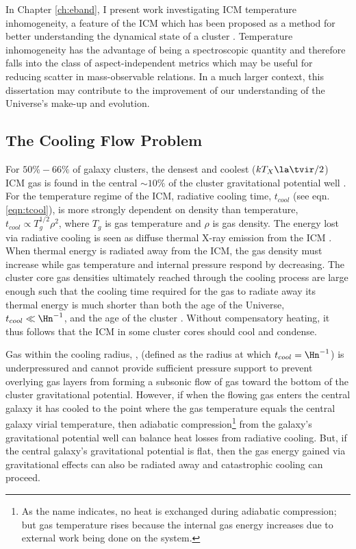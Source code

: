 In Chapter \ref{ch:eband}, I present work investigating ICM
temperature inhomogeneity, a feature of the ICM which has been
proposed as a method for better understanding the dynamical state of a
cluster \citep{2001ApJ...546..100M}. Temperature inhomogeneity has the
advantage of being a spectroscopic quantity and therefore falls into
the class of aspect-independent metrics which may be useful for
reducing scatter in mass-observable relations. In a much larger
context, this dissertation may contribute to the improvement of our
understanding of the Universe's make-up and evolution.

\subsection{The Cooling Flow Problem}
\label{sec:cfprob}

For $50\%-66\%$ of galaxy clusters, the densest and coolest ($kT_X \la
\tvir/2$) ICM gas is found in the central $\sim 10\%$ of the cluster
gravitational potential well \citep{1984ApJ...285....1S,
  1992MNRAS.258..177E, white97, 1998MNRAS.298..416P,
  2005MNRAS.359.1481B}. For the temperature regime of the ICM,
radiative cooling time, $t_{cool}$ (see eqn. \ref{eqn:tcool}), is more
strongly dependent on density than temperature, $t_{cool} \propto
T_g^{1/2}\rho^2$, where $T_g$ is gas temperature and $\rho$ is gas
density. The energy lost via radiative cooling is seen as diffuse
thermal X-ray emission from the ICM \citep{gursky71, mitchell76,
  serle77}. When thermal energy is radiated away from the ICM, the gas
density must increase while gas temperature and internal pressure
respond by decreasing. The cluster core gas densities ultimately
reached through the cooling process are large enough such that the
cooling time required for the gas to radiate away its thermal energy
is much shorter than both the age of the Universe, \eg\ $t_{cool} \ll
\Hn^{-1}$, and the age of the cluster \citep{cowie77,
  fabian77}. Without compensatory heating, it thus follows that the
ICM in some cluster cores should cool and condense.

Gas within the cooling radius, \rcool, (defined as the radius at which
$t_{cool} = \Hn^{-1}$) is underpressured and cannot provide sufficient
pressure support to prevent overlying gas layers from forming a
subsonic flow of gas toward the bottom of the cluster gravitational
potential. However, if when the flowing gas enters the central galaxy
it has cooled to the point where the gas temperature equals the
central galaxy virial temperature, then adiabatic
compression\footnote{As the name indicates, no heat is exchanged
during adiabatic compression; but gas temperature rises because the
internal gas energy increases due to external work being done on the
system.} from the galaxy's gravitational potential well can balance
heat losses from radiative cooling. But, if the central galaxy's
gravitational potential is flat, then the gas energy gained via
gravitational effects can also be radiated away and catastrophic
cooling can proceed.

